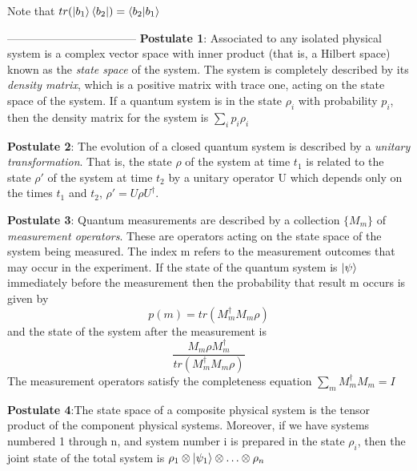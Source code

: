 Note that $tr(\ket{b_1}\bra{b_2})=\braket{b_2|b_1}$

-----------------------------------
\textbf{Postulate 1}: Associated to any isolated physical system is a complex vector space with inner product (that is, a Hilbert space) known as the \textit{state space} of the system. The system is completely described by its \textit{density matrix}, which is a positive matrix with trace one, acting on the state space of the system. If a quantum system is in the state $\rho_i$ with probability $p_i$, then the density matrix for the system is $\sum_i p_i \rho_i$

\textbf{Postulate 2}: The evolution of a closed quantum system is described by a \textit{unitary transformation}. That is, the state $\rho$ of the system at time $t_1$ is related to the state $\rho'$ of the system at time $t_2$ by a unitary operator U which depends only on the times $t_1$ and $t_2$, $\rho'=U\rho U^\dagger$.

\textbf{Postulate 3}: Quantum measurements are described by a collection $\{M_m\}$ of \textit{measurement operators}. These are operators acting on the state space of the system being measured. The index m refers to the measurement outcomes that may occur in the experiment. If the state of the quantum system is $\ket{\psi}$ immediately before the measurement then the probability that result m occurs is given by 
    \begin{equation}
        p(m)=tr(M_m^\dagger M_m \rho)
    \end{equation}
    and the state of the system after the measurement is
    \begin{equation}
        \frac{M_m \rho M_m^\dagger}{tr(M_m^\dagger M_m \rho)}
    \end{equation}
    The measurement operators satisfy the completeness equation $\sum_m M_m^\dagger M_m =I$
    
\textbf{Postulate 4}:The state space of a composite physical system is the tensor product of the component physical systems. Moreover, if we have systems numbered 1 through n, and system number i is prepared in the state $\rho_i$, then the joint state of the total system is $\rho_1 \otimes \ket{\psi_1} \otimes \hdots \otimes \rho_n$

